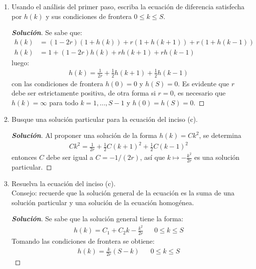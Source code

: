 \documentclass[12pt, letterpaper]{article}
\newenvironment{manualtheorem}[1]{%
  \renewcommand\themanualtheoreminner{#1}%
  \manualtheoreminner
}{\endmanualtheoreminner}
\newenvironment{solucion}
  {\renewcommand\qedsymbol{$\square$}\begin{proof}[\textbf{Solución}]}
  {\end{proof}}
\begin{document}
\begin{manualtheorem}{3.1}
\begin{enumerate}
        \item Usando el análisis del primer paso, escriba la ecuación de diferencia satisfecha por $h(k)$ y sus condiciones de frontera $0\leq k \leq S$.
        \begin{solucion}
            Se sabe que:
            \begin{align*}
                h(k)&=(1-2r)(1+h(k))+r(1+h(k+1)) +r(1+h(k-1))\\
                h(k)&=1+(1-2r)h(k)+rh(k+1)+rh(k-1)
            \end{align*}
            luego:
            \begin{align*}
                h(k)=\frac{1}{2r}+\frac{1}{2}h(k+1) + \frac{1}{2}h(k-1)
            \end{align*}
            con las condiciones de frontera $h(0)=0$ y $h(S)=0$. Es evidente que $r$ debe ser estrictamente positiva, de otra forma si $r=0$, es necesario que $h(k)=\infty$ para todo $k=1, \dots, S-1$ y $h(0)=h(S)=0$.
        \end{solucion}
        
        \item Busque una solución particular para la ecuación del inciso (c).
        \begin{solucion}
            Al proponer una solución de la forma $h(k)=Ck^2$, se determina
            \begin{align*}
                Ck^2=\frac{1}{2r}+\frac{1}{2}C(k+1)^2+\frac{1}{2}C(k-1)^2
            \end{align*}
            entonces $C$ debe ser igual a $C=-1/(2r)$, así que $k \mapsto -\frac{k^2}{2r}$ es una solución particular.
        \end{solucion}
        
        \item Resuelva la ecuación del inciso (c).\\
        Consejo: recuerde que la solución general de la ecuación es la suma de una solución particular y una solución de la ecuación homogénea.
        \begin{solucion}
            Se sabe que la solución general tiene la forma:
            \begin{align*}
                h(k)=C_1 + C_2k-\frac{k^2}{2r} & &  0 \leq k \leq S
            \end{align*}
            Tomando las condiciones de frontera se obtiene:
            \begin{align*}
                h(k)=\frac{k}{2r}(S-k) & & 0 \leq k \leq S
            \end{align*}
        \end{solucion}
        

\end{enumerate}
\end{manualtheorem}
\end{document}
